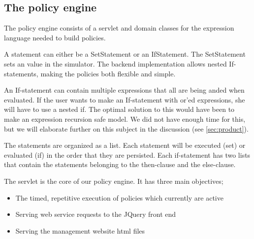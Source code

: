 \subsection{The policy engine}\label{subsec:policyengine}
The policy engine consists of a servlet and domain classes for the expression language needed to build policies. 

A statement can either be a SetStatement or an IfStatement. The SetStatement sets an value in the simulator. The backend implementation allows nested If-statements, making the policies both flexible and simple. 

An If-statement can contain multiple expressions that all are being anded when evaluated. If the user wants to make an If-statement with or'ed expressions, she will have to use a nested if. The optimal solution to this would have been to make an expression recursion safe model. We did not have enough time for this, but we will elaborate further on this subject in the discussion (see \ref{sec:product}). 

The statements are organized as a list. Each statement will be executed (set) or evaluated (if) in the order that they are persisted. Each if-statement has two lists that contain the statements belonging to the then-clause and the else-clause.

The servlet is the core of our policy engine. It has three main objectives;

\begin{figure}[b]
\end{figure}

\begin{itemize}
	\item The timed, repetitive execution of policies which currently are active
	\item Serving web service requests to the JQuery front end
	\item Serving the management website html files
\end{itemize}

